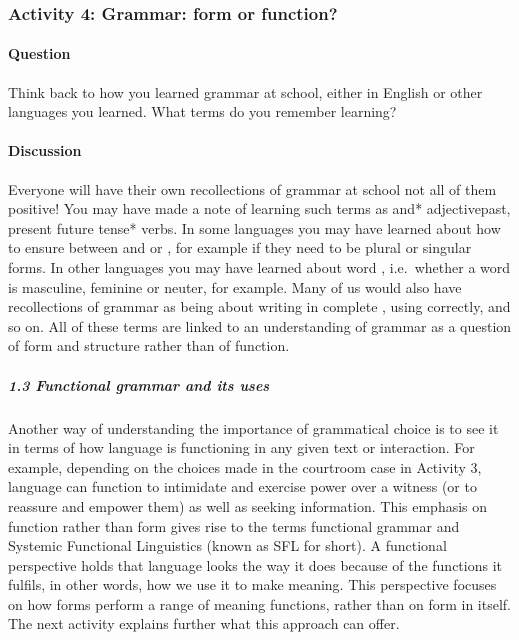 \documentclass[letterpaper,10pt,english]{sphinxmanual}
\begin{document}
\subsubsection{Activity 4: Grammar: form or function?}
\label{\detokenize{content/session_00/Part_00_01:Activity-4:-Grammar:-form-or-function?}}


\paragraph{Question}
\label{\detokenize{content/session_00/Part_00_01:id7}}
Think back to how you learned grammar at school, either in English or other languages you learned. What terms do you remember learning?


\paragraph{Discussion}
\label{\detokenize{content/session_00/Part_00_01:id8}}
Everyone will have their own recollections of grammar at school \textendash{} not all of them positive! You may have made a note of learning such terms as and* adjectivepast, present future tense* verbs. In some languages you may have learned about how to ensure  between  and  or , for example if they need to be plural or singular forms. In other languages you may have learned about
word , i.e. whether a word is masculine, feminine or neuter, for example. Many of us would also have recollections of grammar as being about writing in complete , using  correctly, and so on. All of these terms are linked to an understanding of grammar as a question of form and structure rather than of function.


\subparagraph{1.3 Functional grammar and its uses}
\label{\detokenize{content/session_00/Part_00_01:1.3-Functional-grammar-and-its-uses}}
Another way of understanding the importance of grammatical choice is to see it in terms of how language is functioning in any given text or interaction. For example, depending on the choices made in the courtroom case in Activity 3, language can function to intimidate and exercise power over a witness (or to reassure and empower them) as well as seeking information. This emphasis on function rather than form gives rise to the terms functional grammar and Systemic Functional Linguistics (known as
SFL for short). A functional perspective holds that language looks the way it does because of the functions it fulfils, in other words, how we use it to make meaning. This perspective focuses on how forms perform a range of meaning functions, rather than on form in itself. The next activity explains further what this approach can offer.
\end{document}
